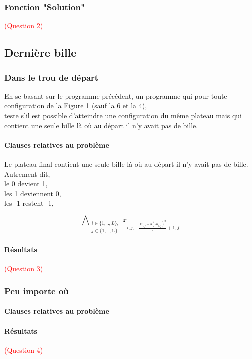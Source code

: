 \documentclass[utf8]{article}
\begin{document}
\subsubsection{Fonction "Solution"}
\textcolor{red}{(Question 2)}

\newpage

\subsection{ Dernière bille }
\subsubsection{Dans le trou de départ}
En se basant sur le programme précédent, 
un programme qui pour toute configuration de la Figure 1 (sauf la 6 et la
4), \\
teste s’il est possible d’atteindre une configuration du même plateau
mais qui contient une seule bille là où au départ il n’y avait pas de bille.

\paragraph{Clauses relatives au problème}
Le plateau final contient une seule bille là où au départ il n’y avait pas de bille.
Autrement dit, 
\\le 0 devient 1,
\\les 1 deviennent 0,
\\les -1 restent -1,

\[
\mathop{\mathbb{\bigwedge}}_{\substack{i \in \{1,..,L\},\\ j \in \{1,..,C\}}} x_{i,j, -\frac{M_{i,j} - 3(M_{i,j})^2}{2} + 1, f}
\]

\paragraph{Résultats}
\textcolor{red}{(Question 3)}


\subsubsection{ Peu importe où}
\paragraph{Clauses relatives au problème}

\paragraph{Résultats}
\textcolor{red}{(Question 4)}
\end{document}
